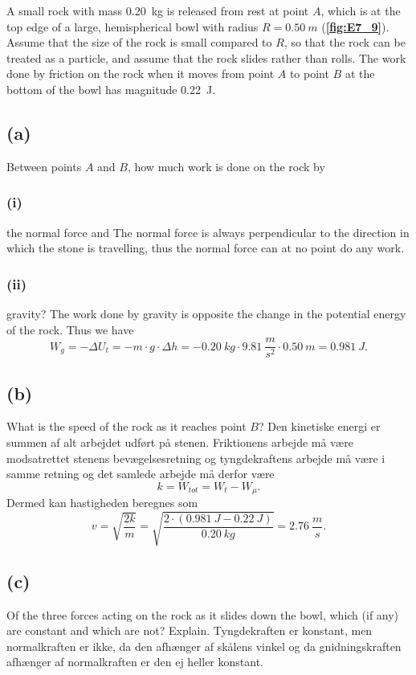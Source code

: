 \documentclass[12pt]{article}
\begin{document}
A small rock with mass \qty{0,20}{kg} is released from rest at point $A$, which is at the top edge of a large, hemispherical bowl with radius $R = \qty{0,50}{m}$ (\textbf{\autoref{fig:E7_9}}). Assume that the size of the rock is small compared to $R$, so that the rock can be treated as a particle, and assume that the rock slides rather than rolls. The work done by friction on the rock when it moves from point $A$ to point $B$ at the bottom of the bowl has magnitude \qty{0,22}{J}.

\subsection*{(a)}
Between points $A$ and $B$, how much work is done on the rock by

\subsubsection*{(i)}
the normal force and
\bigbreak
The normal force is always perpendicular to the direction in which the stone is travelling, thus the normal force can at no point do any work.

\subsubsection*{(ii)}
gravity?
\bigbreak
The work done by gravity is opposite the change in the potential energy of the rock. Thus we have
\[
W_g = -\Delta U_t = -m\cdot g\cdot \Delta h = -\qty{0,20}{kg}\cdot \qty{9,81}{\frac{m}{s^2}}\cdot \qty{0,50}{m} = \qty{0,981}{J}
.\] 

\subsection*{(b)}
What is the speed of the rock as it reaches point $B$?
\bigbreak
Den kinetiske energi er summen af alt arbejdet udført på stenen. Friktionens arbejde må være modsatrettet stenens bevægelsesretning og tyngdekraftens arbejde må være i samme retning og det samlede arbejde må derfor være 
\[
k = W_{tot} = W_t - W_\mu
.\] 
Dermed kan hastigheden beregnes som
\[
v = \sqrt{\frac{2k}{m}} = \sqrt{\frac{2\cdot \left( \qty{0,981}{J} - \qty{0,22}{J} \right) }{\qty{0,20}{kg}}} = \qty{2,76}{\frac{m}{s}} 
.\] 


\subsection*{(c)}
Of the three forces acting on the rock as it slides down the bowl, which (if any) are constant and which are not? Explain.
\bigbreak
Tyngdekraften er konstant, men normalkraften er ikke, da den afhænger af skålens vinkel og da gnidningskraften afhænger af normalkraften er den ej heller konstant.
\end{document}
